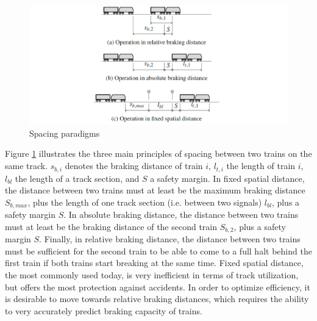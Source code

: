 \begin{figure}[htb!]
	\centering
	\includegraphics[width=\linewidth]{./pic/abstaende}
	\caption{Spacing paradigms \cite{Pfaff2017}}
	\label{fig:train_spacing}
\end{figure}

\par\noindent
Figure \ref{fig:train_spacing} illustrates the three main principles of spacing between two trains on the same track. $s_{b,i}$ denotes the braking distance of train $i$, $l_{t,i}$ the length of train $i$, $l_{bl}$ the length of a track section, and $S$ a safety margin. In fixed spatial distance, the distance between two trains must at least be the maximum braking distance $S_{b,max}$, plus the length of one track section (i.e. between two signals) $l_{bl}$, plus a safety margin $S$. In absolute braking distance, the distance between two trains must at least be the braking distance of the second train $S_{b,2}$, plus a safety margin $S$. Finally, in relative braking distance, the distance between two trains must be sufficient for the second train to be able to come to a full halt behind the first train if both trains start breaking at the same time. Fixed spatial distance, the most commonly used today, is very inefficient in terms of track utilization, but offers the most protection against accidents. In order to optimize efficiency, it is desirable to move towards relative braking distances, which requires the ability to very accurately predict braking capacity of trains.

